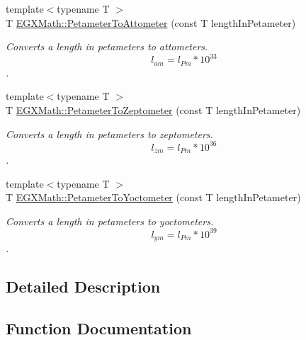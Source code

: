 \begin{DoxyCompactItemize}
{\footnotesize template$<$typename T $>$ }\\T \mbox{\hyperlink{group___e_g_x_math-_conversions-_length_conversions-_s_i-_petameter-_s_i_ga4803fb5abfc83b6bdb8dce9fffff8fbe}{E\+G\+X\+Math\+::\+Petameter\+To\+Attometer}} (const T length\+In\+Petameter)
\begin{DoxyCompactList}\small\item\em Converts a length in petameters to attometers. \[ l_{am}=l_{Pm} * 10^{33} \]. \end{DoxyCompactList}\item 
{\footnotesize template$<$typename T $>$ }\\T \mbox{\hyperlink{group___e_g_x_math-_conversions-_length_conversions-_s_i-_petameter-_s_i_ga8c7a1ddfa7557e65e26e65e17a9e3a45}{E\+G\+X\+Math\+::\+Petameter\+To\+Zeptometer}} (const T length\+In\+Petameter)
\begin{DoxyCompactList}\small\item\em Converts a length in petameters to zeptometers. \[ l_{zm}=l_{Pm} * 10^{36} \]. \end{DoxyCompactList}\item 
{\footnotesize template$<$typename T $>$ }\\T \mbox{\hyperlink{group___e_g_x_math-_conversions-_length_conversions-_s_i-_petameter-_s_i_ga6fd2701bf757e5a6ca26a0d506471433}{E\+G\+X\+Math\+::\+Petameter\+To\+Yoctometer}} (const T length\+In\+Petameter)
\begin{DoxyCompactList}\small\item\em Converts a length in petameters to yoctometers. \[ l_{ym}=l_{Pm} * 10^{39} \]. \end{DoxyCompactList}\end{DoxyCompactItemize}


\subsection{Detailed Description}


\subsection{Function Documentation}
\mbox{\label{group___e_g_x_math-_conversions-_length_conversions-_s_i-_petameter-_s_i_ga4803fb5abfc83b6bdb8dce9fffff8fbe}} 
